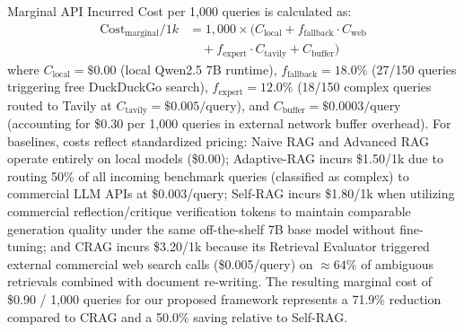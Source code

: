 \documentclass[conference]{IEEEtran}
\begin{document}
Marginal API Incurred Cost per 1,000 queries is calculated as:
\begin{equation}
\begin{aligned}
\text{Cost}_{\text{marginal}}/1k
&= 1{,}000 \times \big(
C_{\text{local}}
+ f_{\text{fallback}} \cdot C_{\text{web}} \\
&\quad + f_{\text{expert}} \cdot C_{\text{tavily}}
+ C_{\text{buffer}} \big)
\end{aligned}
\end{equation}
where $C_{\text{local}} = \$0.00$ (local Qwen2.5 7B runtime), $f_{\text{fallback}} = 18.0\%$ (27/150 queries triggering free DuckDuckGo search), $f_{\text{expert}} = 12.0\%$ (18/150 complex queries routed to Tavily at $C_{\text{tavily}} = \$0.005/\text{query}$), and $C_{\text{buffer}} = \$0.0003/\text{query}$ (accounting for \$0.30 per 1,000 queries in external network buffer overhead). For baselines, costs reflect standardized pricing: Naive RAG and Advanced RAG operate entirely on local models (\$0.00); Adaptive-RAG incurs \$1.50/1k due to routing 50\% of all incoming benchmark queries (classified as complex) to commercial LLM APIs at \$0.003/query; Self-RAG incurs \$1.80/1k when utilizing commercial reflection/critique verification tokens to maintain comparable generation quality under the same off-the-shelf 7B base model without fine-tuning; and CRAG incurs \$3.20/1k because its Retrieval Evaluator triggered external commercial web search calls (\$0.005/query) on $\approx 64\%$ of ambiguous retrievals combined with document re-writing. The resulting marginal cost of \$0.90 / 1,000 queries for our proposed framework represents a 71.9\% reduction compared to CRAG and a 50.0\% saving relative to Self-RAG.
\end{document}
